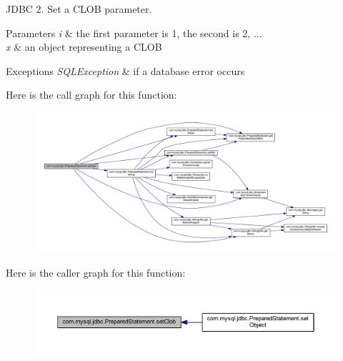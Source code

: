 J\+D\+BC 2. Set a C\+L\+OB parameter.


\begin{DoxyParams}{Parameters}
{\em i} & the first parameter is 1, the second is 2, ... \\
\hline
{\em x} & an object representing a C\+L\+OB\\
\hline
\end{DoxyParams}

\begin{DoxyExceptions}{Exceptions}
{\em S\+Q\+L\+Exception} & if a database error occurs \\
\hline
\end{DoxyExceptions}
Here is the call graph for this function\+:
\nopagebreak
\begin{figure}[H]
\begin{center}
\leavevmode
\includegraphics[width=350pt]{classcom_1_1mysql_1_1jdbc_1_1_prepared_statement_afede5384371c1526e48fe4a923bc2292_cgraph}
\end{center}
\end{figure}
Here is the caller graph for this function\+:
\nopagebreak
\begin{figure}[H]
\begin{center}
\leavevmode
\includegraphics[width=350pt]{classcom_1_1mysql_1_1jdbc_1_1_prepared_statement_afede5384371c1526e48fe4a923bc2292_icgraph}
\end{center}
\end{figure}
\mbox{\label{classcom_1_1mysql_1_1jdbc_1_1_prepared_statement_a7fff0e5cc0d3a8205620da02c39f4673}} 
